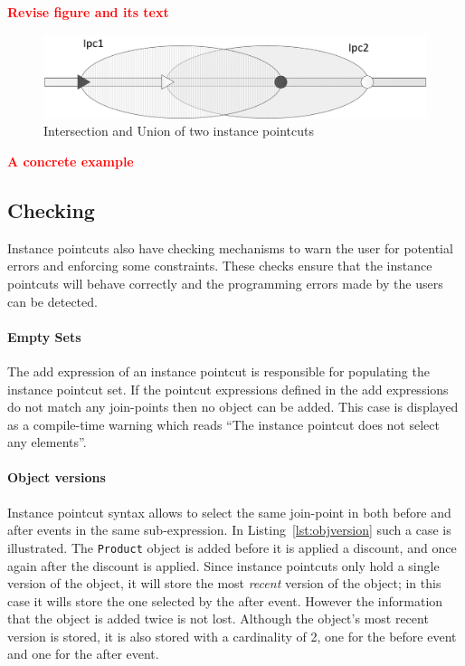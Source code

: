\documentclass{acm_proc_article-sp}
\newcommand{\todok}[1]{\textcolor{red}{\textbf{#1}}}
\newcommand{\lstinln}[1]{\lstinline~#1~}
\begin{document}
\todok{Revise figure and its text}

\begin{figure}
	\centering
		\includegraphics[width=\columnwidth]{images/interunionvis.png}
	\caption{Intersection and Union of two instance pointcuts}
	\label{fig:interunionvis}
\end{figure}

\todok{A concrete example}

\subsection{Checking}
Instance pointcuts also have checking mechanisms to warn the user for potential errors and enforcing some constraints. These checks ensure that the instance pointcuts will behave correctly and the programming errors made by the users can be detected. 

\paragraph*{Empty Sets} The add expression of an instance pointcut is responsible for populating the instance pointcut set. If the pointcut expressions defined in the add expressions do not match any join-points then no object can be added. This case is displayed as a compile-time warning which reads ``The instance pointcut does not select any elements''. 

\paragraph*{Object versions} Instance pointcut syntax allows to select the same join-point in both before and after events in the same sub-expression. In Listing~\ref{lst:objversion} such a case is illustrated. The \lstinln{Product} object is added before it is applied a discount, and once again after the discount is applied. Since instance pointcuts only hold a single version of the object, it will store the most \emph{recent} version of the object; in this case it wills store the one selected by the after event. However the information that the object is added twice is not lost. Although the object's most recent version is stored, it is also stored with a cardinality of 2, one for the before event and one for the after event. 
\end{document}
